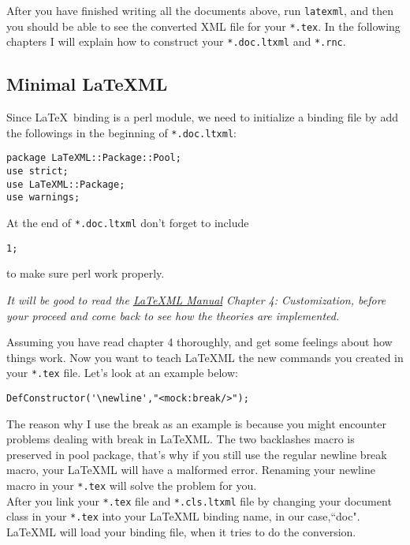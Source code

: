 \documentclass{article}
\begin{document}
\noindent After you have finished writing all the documents above, run \texttt{latexml}, and then you should be able to see the converted XML file for your \texttt{*.tex}. In the following chapters I will explain how to construct your \texttt{*.doc.ltxml} and \texttt{*.rnc}.

\subsection{Minimal \LaTeX ML}
Since \LaTeX\ binding is a perl module, we need to initialize a binding file by add the followings in the beginning of \texttt{*.doc.ltxml}: \\
\begin{lstlisting}
package LaTeXML::Package::Pool;
use strict;
use LaTeXML::Package;
use warnings;
\end{lstlisting}
At the end of \texttt{*.doc.ltxml} don't forget to include \\
\begin{lstlisting}
1;
\end{lstlisting}
to make sure perl work properly.

\begin{tcolorbox}
{\emph{It will be good to read the \href{http://dlmf.nist.gov/LaTeXML/manual.pdf}{\LaTeX ML Manual} Chapter 4: Customization, before
your proceed and come back to see how the theories are implemented.}}
\end{tcolorbox}

\noindent Assuming you have read chapter 4 thoroughly, and get some feelings about how things work. Now you want to teach \LaTeX ML the new commands you created in your \texttt{*.tex} file. Let's look at an example below:\\

\begin{lstlisting}
DefConstructor('\newline',"<mock:break/>");
\end{lstlisting}

\noindent The reason why I use the break as an example is because you might encounter problems dealing with break in \LaTeX ML. The two backlashes macro is preserved in pool package, that's why if you still use the regular newline break macro, your \LaTeX ML will have a malformed error. Renaming your newline macro in your \texttt{*.tex} will solve the problem for you.\\

\noindent After you link your \texttt{*.tex} file and \texttt{*.cls.ltxml} file by changing your document class in your \texttt{*.tex} into your \LaTeX ML binding name, in our case,``doc". \LaTeX ML will load your binding file, when it tries to do the conversion.\\
\end{document}

